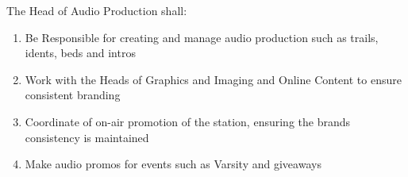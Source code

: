 \item The Head of Audio Production shall:
\begin{enumerate}[label*=\arabic*.]
    \item Be Responsible for creating and manage audio production such as trails, idents, beds and intros
    \item Work with the Heads of Graphics and Imaging and Online Content to ensure consistent branding
    \item Coordinate of on-air promotion of the station, ensuring the brands consistency is maintained
    \item Make audio promos for events such as Varsity and giveaways
\end{enumerate}
